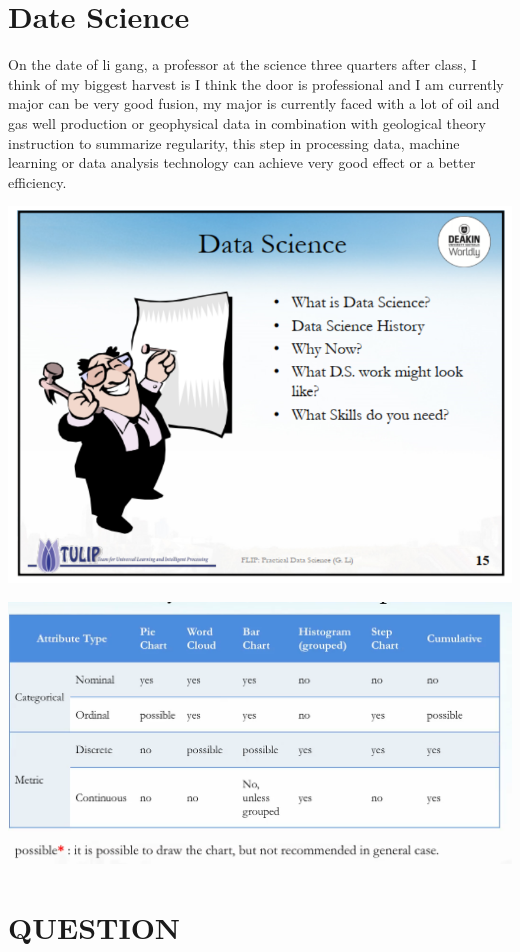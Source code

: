\section{Date Science} \label{sec-preliminaries}
On the date of li gang, a professor at the science three quarters after class, I think of my biggest harvest is I think the door is professional and I am currently major can be very good fusion, my major is currently faced with a lot of oil and gas well production or geophysical data in combination with geological theory instruction to summarize regularity, this step in processing data, machine learning or data analysis technology can achieve very good effect or a better efficiency.\par
\includegraphics[scale=0.4]{date science1}\par
\includegraphics[scale=0.3]{date science2}\par
  \par
  \par

\section{QUESTION} \label{sec-method}





